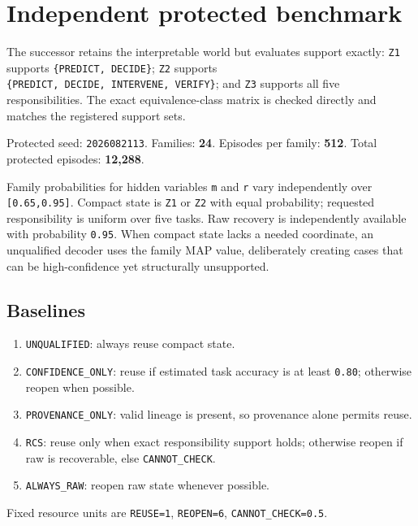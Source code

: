 \section{Independent protected
benchmark}\label{independent-protected-benchmark}

The successor retains the interpretable world but evaluates support
exactly: \texttt{Z1} supports \texttt{\{PREDICT,\ DECIDE\}}; \texttt{Z2}
supports \texttt{\{PREDICT,\ DECIDE,\ INTERVENE,\ VERIFY\}}; and
\texttt{Z3} supports all five responsibilities. The exact
equivalence-class matrix is checked directly and matches the registered
support sets.

Protected seed: \texttt{2026082113}. Families: \textbf{24}. Episodes per
family: \textbf{512}. Total protected episodes: \textbf{12,288}.

Family probabilities for hidden variables \texttt{m} and \texttt{r} vary
independently over \texttt{{[}0.65,0.95{]}}. Compact state is
\texttt{Z1} or \texttt{Z2} with equal probability; requested
responsibility is uniform over five tasks. Raw recovery is independently
available with probability \texttt{0.95}. When compact state lacks a
needed coordinate, an unqualified decoder uses the family MAP value,
deliberately creating cases that can be high-confidence yet structurally
unsupported.

\subsection{Baselines}\label{baselines}

\begin{enumerate}
\def\labelenumi{\arabic{enumi}.}
\tightlist
\item
  \texttt{UNQUALIFIED}: always reuse compact state.
\item
  \texttt{CONFIDENCE\_ONLY}: reuse if estimated task accuracy is at
  least \texttt{0.80}; otherwise reopen when possible.
\item
  \texttt{PROVENANCE\_ONLY}: valid lineage is present, so provenance
  alone permits reuse.
\item
  \texttt{RCS}: reuse only when exact responsibility support holds;
  otherwise reopen if raw is recoverable, else \texttt{CANNOT\_CHECK}.
\item
  \texttt{ALWAYS\_RAW}: reopen raw state whenever possible.
\end{enumerate}

Fixed resource units are \texttt{REUSE=1}, \texttt{REOPEN=6},
\texttt{CANNOT\_CHECK=0.5}.

